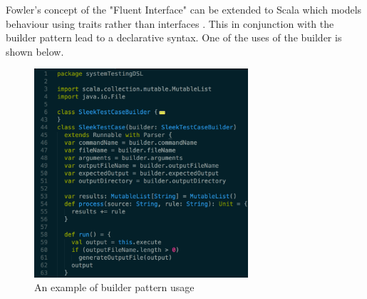 \documentclass[12 pt]{article}
\begin{document}
\noindent
Fowler's concept of the "Fluent Interface" can be extended to Scala which models behaviour using traits rather than interfaces \cite{scala}. This in conjunction with the builder pattern lead to a declarative syntax. One of the uses of the builder is shown below.

\begin{figure}[h!]
  \centering
    \includegraphics[width=300px]{figures/builder_pattern.png}
  \caption{An example of builder pattern usage}
\end{figure}
\end{document}
